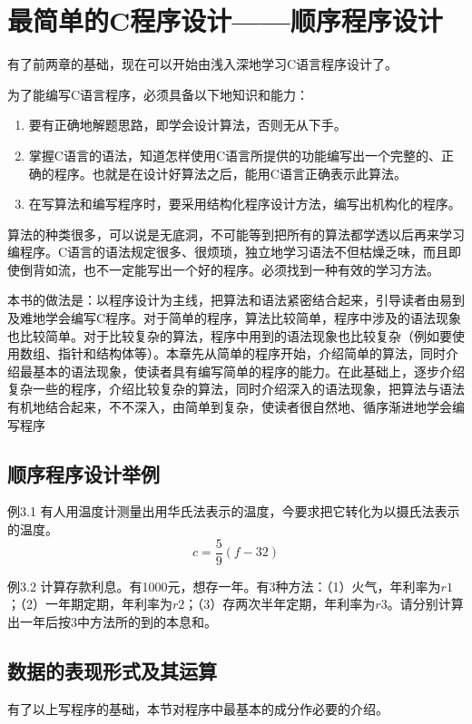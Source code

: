 \chapter{最简单的C程序设计——顺序程序设计}

有了前两章的基础，现在可以开始由浅入深地学习C语言程序设计了。

为了能编写C语言程序，必须具备以下地知识和能力：
\begin{enumerate}
	\item 要有正确地解题思路，即学会设计算法，否则无从下手。
	\item 掌握C语言的语法，知道怎样使用C语言所提供的功能编写出一个完整的、正确的程序。也就是在设计好算法之后，能用C语言正确表示此算法。
	\item 在写算法和编写程序时，要采用结构化程序设计方法，编写出机构化的程序。
\end{enumerate}
算法的种类很多，可以说是无底洞，不可能等到把所有的算法都学透以后再来学习编程序。C语言的语法规定很多、很烦琐，独立地学习语法不但枯燥乏味，而且即使倒背如流，也不一定能写出一个好的程序。必须找到一种有效的学习方法。

本书的做法是：以程序设计为主线，把算法和语法紧密结合起来，引导读者由易到及难地学会编写C程序。对于简单的程序，算法比较简单，程序中涉及的语法现象也比较简单。对于比较复杂的算法，程序中用到的语法现象也比较复杂（例如要使用数组、指针和结构体等）。本章先从简单的程序开始，介绍简单的算法，同时介绍最基本的语法现象，使读者具有编写简单的程序的能力。在此基础上，逐步介绍复杂一些的程序，介绍比较复杂的算法，同时介绍深入的语法现象，把算法与语法有机地结合起来，不不深入，由简单到复杂，使读者很自然地、循序渐进地学会编写程序
\section{顺序程序设计举例}
例3.1 有人用温度计测量出用华氏法表示的温度，今要求把它转化为以摄氏法表示的温度。
\begin{equation}
	c = \frac{5}{9}(f - 32)
\end{equation}

例3.2 计算存款利息。有1000元，想存一年。有3种方法：（1）火气，年利率为$r1$；（2）一年期定期，年利率为$r2$；（3）存两次半年定期，年利率为$r3$。请分别计算出一年后按3中方法所的到的本息和。
\section{数据的表现形式及其运算}
有了以上写程序的基础，本节对程序中最基本的成分作必要的介绍。

